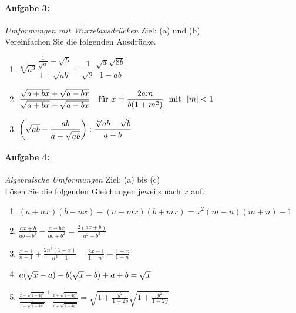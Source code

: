 \paragraph{Aufgabe 3: } \emph{Umformungen mit Wurzelausdrücken} \hfill Ziel: (a) und (b)\\[0.2cm]
Vereinfachen Sie die folgenden Ausdrücke.

\begin{enumerate}[label=(\alph*)]
    \item $\sqrt[6]{a^3}\dfrac{\frac{1}{\sqrt{a}}-\sqrt{b}}{1+\sqrt{ab}}+\dfrac{1}{\sqrt{2}}\dfrac{\sqrt{a}\sqrt{8b}}{1-ab}$
    \item $\dfrac{\sqrt{a+bx}+\sqrt{a-bx}}{\sqrt{a+bx}-\sqrt{a-bx}} \quad \textnormal{für}\,\, x=\dfrac{2am}{b(1+m^2)}\,\,\textnormal{ mit }\,\, |m|<1$
    \item $\qty(\sqrt{ab}-\dfrac{ab}{a+\sqrt{ab}}):\dfrac{\sqrt[4]{ab}-\sqrt{b}}{a-b}$
\end{enumerate}

%
\paragraph{Aufgabe 4: } \emph{Algebraische Umformungen} \hfill Ziel: (a) bis (c)\\[0.2cm]
Lösen Sie die folgenden Gleichungen jeweils nach $x$ auf.

\begin{enumerate}[label=(\alph*)]
    \item $(a+nx)(b-nx)-(a-mx)(b+mx)=x^2(m-n)(m+n)-1$
    \item $\frac{ax+b}{ab-b^2}-\frac{a-bx}{ab+b^2}=\frac{2(ax+b)}{a^2-b^2}$
    \item $\frac{x-1}{n-1}+\frac{2n^2(1-x)}{n^4-1}=\frac{2x-1}{1-n^4}-\frac{1-x}{1+n}$
    \item $a\qty(\sqrt{x}-a)-b\qty(\sqrt{x}-b)+a+b=\sqrt{x}$
    \item $\frac{\frac{1}{x-\sqrt{1-4y^2}}+\frac{1}{x+\sqrt{1-4y^2}}}{\frac{1}{x-\sqrt{1-4y^2}}-\frac{1}{x+\sqrt{1-4y^2}}}=\sqrt{1+\frac{y^2}{1+2y}}\sqrt{1+\frac{y^2}{1-2y}}$
\end{enumerate}